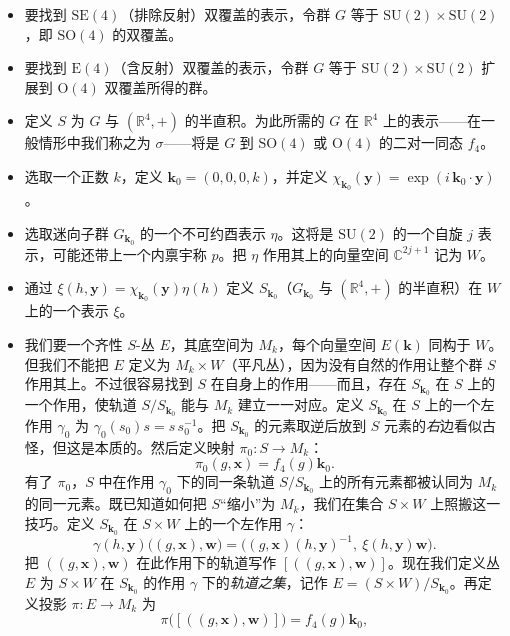 \begin{itemize}
\item 要找到 $\mathrm{SE}(4)$（排除反射）双覆盖的表示，令群 $G$ 等于 $\mathrm{SU}(2)\times\mathrm{SU}(2)$，即 $\mathrm{SO}(4)$ 的双覆盖。
\item 要找到 $\mathrm{E}(4)$（含反射）双覆盖的表示，令群 $G$ 等于 $\mathrm{SU}(2)\times\mathrm{SU}(2)$ 扩展到 $\mathrm{O}(4)$ 双覆盖所得的群。
\item 定义 $S$ 为 $G$ 与 $(\mathbb{R}^4,+)$ 的半直积。为此所需的 $G$ 在 $\mathbb{R}^4$ 上的表示——在一般情形中我们称之为 $\sigma$——将是 $G$ 到 $\mathrm{SO}(4)$ 或 $\mathrm{O}(4)$ 的二对一同态 $f_4$。
\item 选取一个正数 $k$，定义 $\mathbf{k}_0=(0,0,0,k)$，并定义 $\chi_{\mathbf{k}_0}(\mathbf{y})=\exp(i\,\mathbf{k}_0\cdot\mathbf{y})$。
\item 选取迷向子群 $G_{\mathbf{k}_0}$ 的一个不可约酉表示 $\eta$。这将是 $\mathrm{SU}(2)$ 的一个自旋 $j$ 表示，可能还带上一个内禀宇称 $p$。把 $\eta$ 作用其上的向量空间 $\mathbb{C}^{2j+1}$ 记为 $W$。
\item 通过 $\xi(h,\mathbf{y})=\chi_{\mathbf{k}_0}(\mathbf{y})\eta(h)$ 定义 $S_{\mathbf{k}_0}$（$G_{\mathbf{k}_0}$ 与 $(\mathbb{R}^4,+)$ 的半直积）在 $W$ 上的一个表示 $\xi$。
\item 我们要一个齐性 $S$-丛 $E$，其底空间为 $M_k$，每个向量空间 $E(\mathbf{k})$ 同构于 $W$。但我们不能把 $E$ 定义为 $M_k\times W$（平凡丛），因为没有自然的作用让整个群 $S$ 作用其上。不过很容易找到 $S$ 在自身上的作用——而且，存在 $S_{\mathbf{k}_0}$ 在 $S$ 上的一个作用，使轨道 $S/S_{\mathbf{k}_0}$ 能与 $M_k$ 建立一一对应。定义 $S_{\mathbf{k}_0}$ 在 $S$ 上的一个左作用 $\gamma_0$ 为 $\gamma_0(s_0)s=s\,s_0^{-1}$。把 $S_{\mathbf{k}_0}$ 的元素取逆后放到 $S$ 元素的\emph{右}边看似古怪，但这是本质的。然后定义映射 $\pi_0:S\to M_k$：
\[
\pi_0(g,\mathbf{x})=f_4(g)\mathbf{k}_0 .
\]
有了 $\pi_0$，$S$ 中在作用 $\gamma_0$ 下的同一条轨道 $S/S_{\mathbf{k}_0}$ 上的所有元素都被认同为 $M_k$ 的同一元素。既已知道如何把 $S$“缩小”为 $M_k$，我们在集合 $S\times W$ 上照搬这一技巧。定义 $S_{\mathbf{k}_0}$ 在 $S\times W$ 上的一个左作用 $\gamma$：
\[
\gamma(h,\mathbf{y})\big((g,\mathbf{x}),\mathbf{w}\big)=\big((g,\mathbf{x})(h,\mathbf{y})^{-1},\ \xi(h,\mathbf{y})\mathbf{w}\big).
\]
把 $((g,\mathbf{x}),\mathbf{w})$ 在此作用下的轨道写作 $[((g,\mathbf{x}),\mathbf{w})]$。现在我们定义丛 $E$ 为 $S\times W$ 在 $S_{\mathbf{k}_0}$ 的作用 $\gamma$ 下的\emph{轨道之集}，记作 $E=(S\times W)/S_{\mathbf{k}_0}$。再定义投影 $\pi:E\to M_k$ 为
\[
\pi\big([((g,\mathbf{x}),\mathbf{w})]\big)=f_4(g)\mathbf{k}_0,
\]
\end{itemize}
